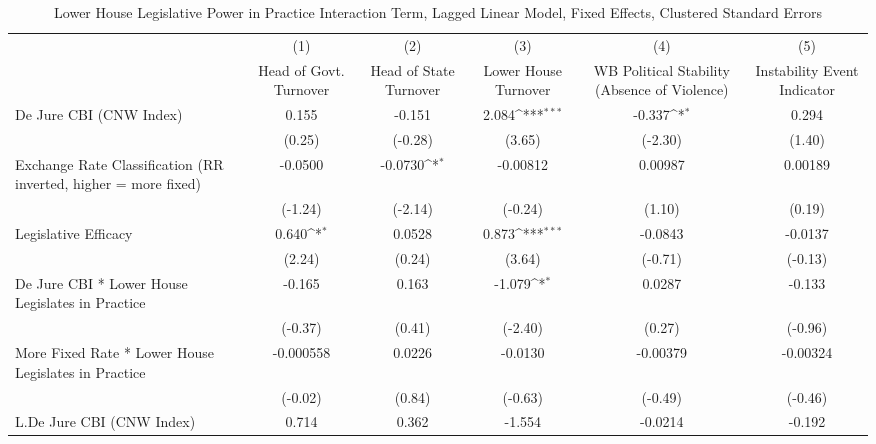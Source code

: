 {
\def\sym#1{\ifmmode^{#1}\else\(^{#1}\)\fi}
\begin{longtable}{l*{5}{c}}
\caption{Lower House Legislative Power in Practice Interaction Term, Lagged Linear Model, Fixed Effects, Clustered Standard Errors \label{llpintlagsDJ}}\\
\hline\hline\endfirsthead\hline\endhead\hline\endfoot\endlastfoot
                &\multicolumn{1}{c}{(1)}&\multicolumn{1}{c}{(2)}&\multicolumn{1}{c}{(3)}&\multicolumn{1}{c}{(4)}&\multicolumn{1}{c}{(5)}\\
                &\multicolumn{1}{c}{Head of Govt. Turnover}&\multicolumn{1}{c}{Head of State Turnover}&\multicolumn{1}{c}{Lower House Turnover}&\multicolumn{1}{c}{WB Political Stability (Absence of Violence)}&\multicolumn{1}{c}{Instability Event Indicator}\\
\hline
De Jure CBI (CNW Index)&    0.155         &   -0.151         &    2.084\sym{***}&   -0.337\sym{*}  &    0.294         \\
                &   (0.25)         &  (-0.28)         &   (3.65)         &  (-2.30)         &   (1.40)         \\
[1em]
Exchange Rate Classification (RR inverted, higher = more fixed)&  -0.0500         &  -0.0730\sym{*}  & -0.00812         &  0.00987         &  0.00189         \\
                &  (-1.24)         &  (-2.14)         &  (-0.24)         &   (1.10)         &   (0.19)         \\
[1em]
Legislative Efficacy&    0.640\sym{*}  &   0.0528         &    0.873\sym{***}&  -0.0843         &  -0.0137         \\
                &   (2.24)         &   (0.24)         &   (3.64)         &  (-0.71)         &  (-0.13)         \\
[1em]
De Jure CBI * Lower House Legislates in Practice&   -0.165         &    0.163         &   -1.079\sym{*}  &   0.0287         &   -0.133         \\
                &  (-0.37)         &   (0.41)         &  (-2.40)         &   (0.27)         &  (-0.96)         \\
[1em]
More Fixed Rate * Lower House Legislates in Practice&-0.000558         &   0.0226         &  -0.0130         & -0.00379         & -0.00324         \\
                &  (-0.02)         &   (0.84)         &  (-0.63)         &  (-0.49)         &  (-0.46)         \\
[1em]
L.De Jure CBI (CNW Index)&    0.714         &    0.362         &   -1.554         &  -0.0214         &   -0.192         \\

\end{longtable}}
